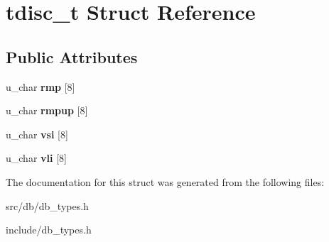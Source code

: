 \hypertarget{structtdisc__t}{
\section{tdisc\_\-t Struct Reference}
\label{structtdisc__t}
}
\subsection*{Public Attributes}
\begin{DoxyCompactItemize}
\item 
\hypertarget{structtdisc__t_a3dd6ecf7756f30fa6c7b23f9af0ba52e}{
u\_\-char {\bfseries rmp} \mbox{[}8\mbox{]}}
\label{structtdisc__t_a3dd6ecf7756f30fa6c7b23f9af0ba52e}

\item 
\hypertarget{structtdisc__t_afe5d059c9d41466e1aae8f2a302d3e84}{
u\_\-char {\bfseries rmpup} \mbox{[}8\mbox{]}}
\label{structtdisc__t_afe5d059c9d41466e1aae8f2a302d3e84}

\item 
\hypertarget{structtdisc__t_a6f6c79fb46cfe24b836469bb1412d648}{
u\_\-char {\bfseries vsi} \mbox{[}8\mbox{]}}
\label{structtdisc__t_a6f6c79fb46cfe24b836469bb1412d648}

\item 
\hypertarget{structtdisc__t_ae2906435d86fd0fb55a07c0c8f2754f8}{
u\_\-char {\bfseries vli} \mbox{[}8\mbox{]}}
\label{structtdisc__t_ae2906435d86fd0fb55a07c0c8f2754f8}

\end{DoxyCompactItemize}


The documentation for this struct was generated from the following files:\begin{DoxyCompactItemize}
\item 
src/db/db\_\-types.h\item 
include/db\_\-types.h\end{DoxyCompactItemize}
